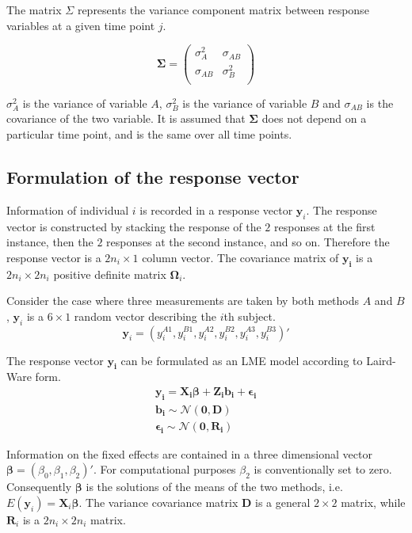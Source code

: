 \documentclass[12pt, a4paper]{article}
\theoremstyle{plain}
\theoremstyle{definition}
\theoremstyle{remark}
\begin{document}
The matrix $\Sigma$ represents the variance component matrix between response variables at a given time point $j$.

\[
\boldsymbol{\Sigma} = \left( \begin{array}{cc}
                        \sigma^2_{A} & \sigma_{AB} \\
                        \sigma_{AB} & \sigma^2_{B}\\
                      \end{array}   \right)
\]

$\sigma^2_{A}$ is the variance of variable $A$, $\sigma^2_{B}$ is the variance of variable $B$ and $\sigma_{AB}$ is the covariance of the two variable. It is assumed that $\boldsymbol{\Sigma}$ does not depend on a particular time point, and is the same over all time points.

\subsection{Formulation of the response vector}
 Information of individual $i$ is recorded in a response vector $\boldsymbol{y}_{i}$. The response vector is constructed by stacking the response of the $2$ responses at the first instance, then the $2$ responses at the second instance, and so on. Therefore the response vector is a $2n_{i} \times 1$ column vector.
The covariance matrix of $\boldsymbol{y_{i}}$ is a $2n_{i} \times 2n_{i}$ positive definite matrix $\boldsymbol{\Omega}_{i}$.

Consider the case where three measurements are taken by both methods $A$ and $B$, $\boldsymbol{y}_{i}$ is a $6 \times 1$ random vector describing the $i$th subject.
\[
\boldsymbol{y}_{i} = (y_{i}^{A1},y_{i}^{B1},y_{i}^{A2},y_{i}^{B2},y_{i}^{A3},y_{i}^{B3}) \prime
\]

The response vector $\boldsymbol{y_{i}}$ can be formulated as an LME model according to Laird-Ware form.
\begin{eqnarray*}
\boldsymbol{y_{i}} = \boldsymbol{X_{i}\beta}  + \boldsymbol{Z_{i}b_{i}} + \boldsymbol{\epsilon_{i}}\\
\boldsymbol{b_{i}} \sim \mathcal{N}(\boldsymbol{0,D})\\
\boldsymbol{\epsilon_{i}} \sim \mathcal{N}(\boldsymbol{0,R_{i}})
\end{eqnarray*}

Information on the fixed effects are contained in a three dimensional vector $\boldsymbol{\beta} = (\beta_{0},\beta_{1},\beta_{2})\prime$. For computational purposes $\beta_{2}$ is conventionally set to zero. Consequently $\boldsymbol{\beta}$ is the solutions of the means of the two methods, i.e. $E(\boldsymbol{y}_{i})  = \boldsymbol{X}_{i}\boldsymbol{\beta}$. The variance covariance matrix $\boldsymbol{D}$ is a general $2 \times 2$ matrix, while $\boldsymbol{R}_{i}$ is a $2n_{i} \times 2n_{i}$ matrix.
\end{document}
